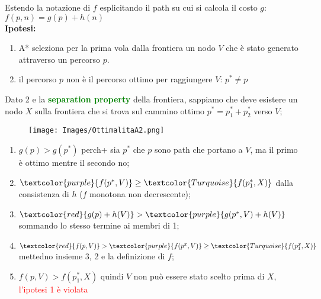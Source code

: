 \documentclass{article}
\begin{document}
Estendo la notazione di $f$ esplicitando il path su cui si calcola il costo $g$: $f(p,n)=g(p)+h(n)$
\\ \textbf{Ipotesi:}
\begin{enumerate}
    \item A* seleziona per la prima vola dalla frontiera un nodo $V$ che è stato generato attraverso un percorso $p$.
    \item il percorso $p$ non è il percorso ottimo per raggiungere $V$: $p^*\neq p$
\end{enumerate}
Dato 2 e la \textcolor{green}{\textbf{separation property}} della frontiera, sappiamo che deve esistere un nodo $X$ sulla frontiera che si trova sul cammino ottimo $p^*=p^*_1+p^*_2$ verso $V$;
\begin{figure}[H]
    \centering
    \texttt{[image: Images/OttimalitaA2.png]}
\end{figure}

\begin{enumerate}
    \item $g(p)>g(p^*)$ perch+ sia $p^*$ che $p$ sono path che portano a $V$, ma il primo è ottimo mentre il secondo no;
    \item $\textcolor{purple}{f(p^*, V)} \geq \textcolor{Turquoise}{f(p^*_1,X)}$ dalla consistenza di $h$ ($f$ monotona non decrescente);
    \item $\textcolor{red}{g(p)+h(V)} > \textcolor{purple}{g(p^*,V) + h(V)}$ sommando lo stesso termine ai membri di 1;
    \item $\textcolor{red}{f(p,V)}> \textcolor{purple}{f(p^x,V)} \geq \textcolor{Turquoise}{f(p^x_1,X)}$ mettedno insieme 3, 2 e la definizione di $f$;
    \item $f(p,V) > f(p^*_1,X)$ quindi $V$ non può essere stato scelto prima di $X$, \textcolor{red}{l'ipotesi 1 è violata}
\end{enumerate}
\end{document}
